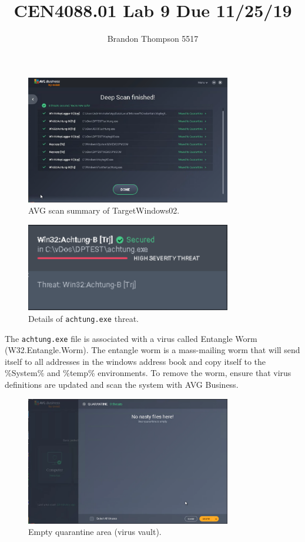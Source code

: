 \documentclass[a4paper]{article}
\begin{document}
	\title{CEN4088.01 Lab 9 Due 11/25/19}
	\author{Brandon Thompson 5517}
	\maketitle

	\begin{figure}[ht!]
		\centering
		\includegraphics[width=0.8\textwidth]{1_2_7}
		\caption{AVG scan summary of TargetWindows02.}
		\label{fig:1_2_7}
	\end{figure}
	\begin{figure}[ht!]
		\centering
		\includegraphics[width=0.8\textwidth]{1_3_2}
		\caption{Details of \texttt{achtung.exe} threat.}
		\label{fig:1_3_2}
	\end{figure}
	The \texttt{achtung.exe} file is associated with a virus called Entangle Worm (W32.Entangle.Worm).
	The entangle worm is a mass-mailing worm that will send itself to all addresses in the
	windows address book and copy itself to the \%System\% and \%temp\% environments. To remove
	the worm, ensure that virus definitions are updated and scan the system with AVG Business.\\
	\begin{figure}[ht!]
		\centering
		\includegraphics[width=0.8\textwidth]{1_3_10}
		\caption{Empty quarantine area (virus vault).}
		\label{fig:1_3_10}
	\end{figure}
\end{document}
